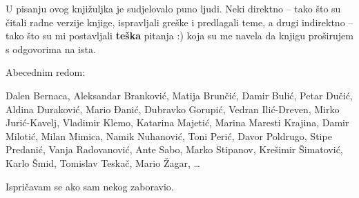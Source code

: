 
U pisanju ovog knjižuljka je sudjelovalo puno ljudi.
Neki direktno -- tako što su čitali radne verzije knjige, ispravljali greške i predlagali teme, a drugi indirektno -- tako što su mi postavljali \textbf{teška} pitanja :) koja su me navela da knjigu proširujem s odgovorima na ista.

Abecednim redom:

Dalen Bernaca,
Aleksandar Branković,
Matija Brunčić,
Damir Bulić,
Petar Dučić,
Aldina Duraković,
Mario Đanić,
Dubravko Gorupić,
Vedran Ilić-Dreven,
Mirko Jurić-Kavelj,
Vladimir Klemo,
Katarina Majetić,
Marina Maresti Krajina,
Damir Milotić, 
Milan Mimica,
Namik Nuhanović,
Toni Perić,
Davor Poldrugo,
Stipe Predanić,
Vanja Radovanović,
Ante Sabo,
Marko Stipanov,
Krešimir Šimatović,
Karlo Šmid,
Tomislav Teskač,
Mario Žagar,
\dots

Ispričavam se ako sam nekog zaboravio.
